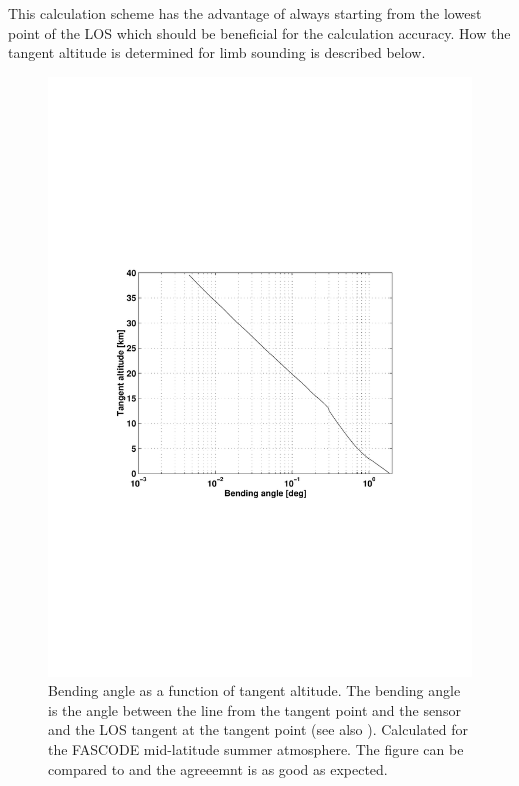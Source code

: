   This calculation scheme has the advantage of always starting from the 
  lowest point of the LOS which should be beneficial for the calculation
  accuracy. How the tangent altitude is determined for limb sounding is 
  described below. 
  

    
   \begin{figure}
    \begin{center}
      \includegraphics*{Figs/fig_bendingangle}
      \caption{Bending angle as a function of tangent altitude. The bending
        angle is the angle between the line from the tangent point and
        the sensor and the LOS tangent at the tangent point (see also
        \citet[][Figure 1]{kursinski:97}). Calculated for the FASCODE
        mid-latitude summer atmosphere. The figure can be compared to
        \citet[][Figure 3]{kursinski:97} and the agreeemnt is as good as
        expected.}
      \label{fig:los:bendingangle} 
    \end{center} 
  \end{figure}


